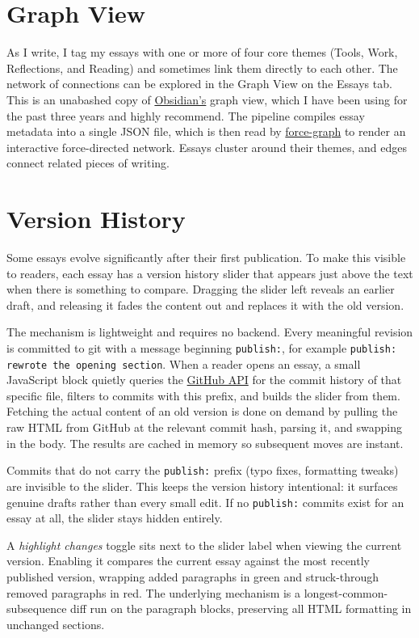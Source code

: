 \documentclass{article}
\begin{document}
\section*{Graph View}
As I write, I tag my essays with one or more of four core themes (Tools, Work, Reflections, and Reading) and sometimes link them directly to each other. The network of connections can be explored in the Graph View on the Essays tab. This is an unabashed copy of \href{https://obsidian.md}{Obsidian's} graph view, which I have been using for the past three years and highly recommend. The pipeline compiles essay metadata into a single JSON file, which is then read by \href{https://github.com/vasturiano/force-graph}{force-graph} to render an interactive force-directed network. Essays cluster around their themes, and edges connect related pieces of writing.

\section*{Version History}
Some essays evolve significantly after their first publication. To make this visible to readers, each essay has a version history slider that appears just above the text when there is something to compare. Dragging the slider left reveals an earlier draft, and releasing it fades the content out and replaces it with the old version.

The mechanism is lightweight and requires no backend. Every meaningful revision is committed to git with a message beginning \texttt{publish:}, for example \texttt{publish: rewrote the opening section}. When a reader opens an essay, a small JavaScript block quietly queries the \href{https://docs.github.com/en/rest}{GitHub API} for the commit history of that specific file, filters to commits with this prefix, and builds the slider from them. Fetching the actual content of an old version is done on demand by pulling the raw HTML from GitHub at the relevant commit hash, parsing it, and swapping in the body. The results are cached in memory so subsequent moves are instant.

Commits that do not carry the \texttt{publish:} prefix (typo fixes, formatting tweaks) are invisible to the slider. This keeps the version history intentional: it surfaces genuine drafts rather than every small edit. If no \texttt{publish:} commits exist for an essay at all, the slider stays hidden entirely.

A \textit{highlight changes} toggle sits next to the slider label when viewing the current version. Enabling it compares the current essay against the most recently published version, wrapping added paragraphs in green and struck-through removed paragraphs in red. The underlying mechanism is a longest-common-subsequence diff run on the paragraph blocks, preserving all HTML formatting in unchanged sections.
\end{document}
